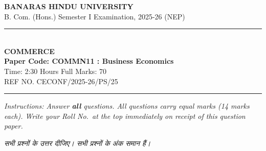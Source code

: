 \documentclass[11pt,a4paper]{article}
\begin{document}
\begin{center}
  {\large\bfseries BANARAS HINDU UNIVERSITY}\\[2pt]
  {\normalsize B. Com. (Hons.) Semester I Examination, 2025-26 (NEP)}\\[6pt]
  \rule{0.8\linewidth}{0.5pt}\\[6pt]
  {\large\bfseries COMMERCE}\\[4pt]
  {\large\bfseries Paper Code: COMMN11 : Business Economics}\\[4pt]
  {\normalsize Time: 2:30 Hours \hfill Full Marks: 70}\\[2pt]
  {\small REF NO. CECONF/2025-26/PS/25}
\end{center}
\rule{\linewidth}{0.4pt}
\smallskip

\noindent \textit{Instructions: Answer \textbf{all} questions. All questions carry equal marks (14 marks each). Write your Roll No.\ at the top immediately on receipt of this question paper.}

\smallskip
\noindent \textit{सभी प्रश्नों के उत्तर दीजिए। सभी प्रश्नों के अंक समान हैं।}

\bigskip
\end{document}

